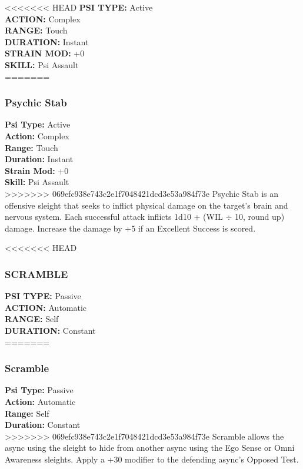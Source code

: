 <<<<<<< HEAD  \textbf{PSI TYPE:} Active \\ \textbf{ACTION:} Complex \\ \textbf{RANGE:} Touch \\ \textbf{DURATION:} Instant \\ \textbf{STRAIN MOD:} +0 \\ \textbf{SKILL:} Psi Assault \\ ======= \subsubsection{Psychic Stab} \textbf{Psi Type:} Active \\ \textbf{Action:} Complex \\ \textbf{Range:} Touch \\ \textbf{Duration:} Instant \\ \textbf{Strain Mod:} +0 \\ \textbf{Skill:} Psi Assault \\ >>>>>>> 069efc938e743c2e1f7048421dcd3e53a984f73e Psychic Stab is an offensive sleight that seeks to inflict physical damage on the target’s brain and nervous system. Each successful attack inflicts 1d10 + (WIL $\div$ 10, round up) damage. Increase the damage by +5 if an Excellent Success is scored. 

<<<<<<< HEAD \subsubsection{SCRAMBLE} \textbf{PSI TYPE:} Passive \\ \textbf{ACTION:} Automatic \\ \textbf{RANGE:} Self \\ \textbf{DURATION:} Constant \\ ======= \subsubsection{Scramble} \textbf{Psi Type:} Passive \\ \textbf{Action:} Automatic \\ \textbf{Range:} Self \\ \textbf{Duration:} Constant \\ >>>>>>> 069efc938e743c2e1f7048421dcd3e53a984f73e Scramble allows the async using the sleight to hide from another async using the Ego Sense or Omni Awareness sleights. Apply a +30 modifier to the defending async’s Opposed Test. 

